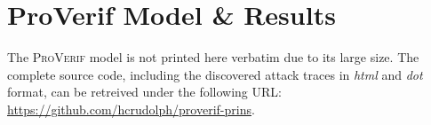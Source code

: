 \section*{ProVerif Model \& Results}

The \textsc{ProVerif} model is not printed here verbatim due to its large size.
The complete source code, including the discovered attack traces in \textit{html} and \textit{dot} format, can be retreived under the following URL: \url{https://github.com/hcrudolph/proverif-prins}.